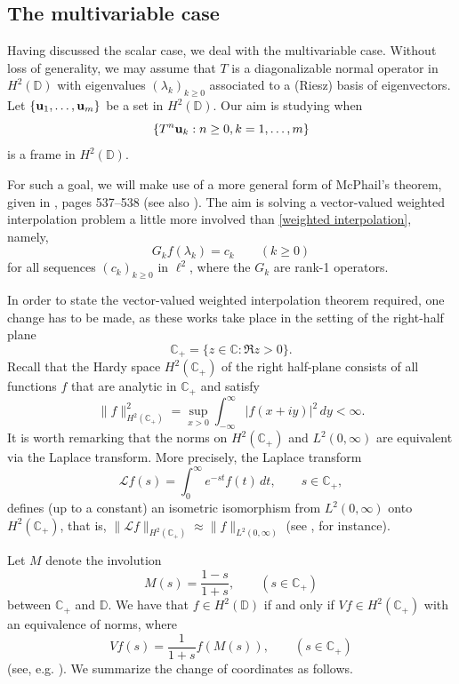 \documentclass[11pt]{amsart}
\theoremstyle{definition}
\theoremstyle{remark}
\numberwithin{equation}{section}
\def\CC{{\mathbb C}}
\def\DD{{\mathbb D}}
\newcommand{\uu}{\textnormal{\textbf{u}} }
\begin{document}
{\subsection*{The multivariable case} Having discussed the scalar case, we deal with the multivariable case. Without loss of generality, we may assume that $T$ is a diagonalizable normal operator in $H^2(\DD)$  with eigenvalues $(\lambda_k)_{k \ge 0}$ associated to a (Riesz) basis of eigenvectors. Let $\{\uu_1,\ldots,\uu_m\}$ be a set in $H^2(\DD)$.  Our aim is studying when
$$\{T^n \uu_k: n \ge 0, k=1,\ldots,m\}$$
is a frame in $H^2(\DD)$.

\smallskip

For such a goal, we will make use of a more general form of McPhail's theorem, given in \cite{JPP07}, pages 537--538 (see also \cite{JZ01}). The aim is solving a vector-valued weighted interpolation problem a little more involved than \eqref{weighted interpolation}, namely,
\begin{equation}\label{weighted interpolation2}
G_k f(\lambda_k)= c_k \qquad (k\geq 0)
\end{equation}
for all sequences $(c_k)_{k\geq 0}$ in $\ell^2$, where the $G_k$ are rank-1 operators.

\smallskip

In order to state the vector-valued weighted interpolation theorem required, one change has to be made, as these works \cite{JZ01,JPP07} take place in the setting of the right-half plane
$$\CC_+=\{ z \in \mathbb{C} : \Re z > 0 \}.$$
Recall that the Hardy space $H^2(\mathbb{C}_+)$ of the right half-plane consists of all functions
$f$ that are analytic in $\mathbb{C}_+$ and satisfy
\[
\|f\|_{H^2(\mathbb{C}_+)}^2=
\sup_{x>0}
\int_{-\infty}^{\infty} |f(x+iy)|^2 \, dy
< \infty.
\]
It is worth remarking that the norms on $H^2(\mathbb{C}_+)$ and $L^2(0,\infty)$ are equivalent via the Laplace
transform. More precisely, the Laplace transform
\[
\mathcal{L}f(s)= \int_0^\infty e^{-st} f(t)\,dt,
\qquad s \in \mathbb{C}_+,
\]
defines (up to a constant) an isometric isomorphism from $L^2(0,\infty)$ onto $H^2(\mathbb{C}_+)$, that is,
$\|\mathcal{L}f\|_{H^2(\mathbb{C}_+)}\approx\|f\|_{L^2(0,\infty)}$ (see \cite{LOLS}, for instance).

\smallskip

Let $M$ denote the involution
$$M(s)=\frac{1-s}{1+s}, \qquad (s\in \CC_+)$$
between $\CC_+$ and $\DD$. We have that $f\in H^2(\DD)$ if and only if $Vf \in H^2(\CC_+)$ with an equivalence of norms, where
$$Vf(s)= \frac{1}{1+s} f(M(s)), \qquad (s \in \CC_+)$$
(see, e.g. \cite[Chap. 8]{hoffman}). We summarize the change of coordinates as follows.

}
\end{document}
